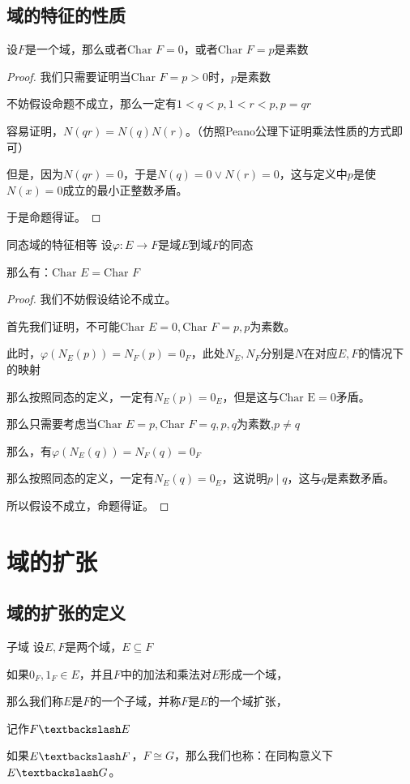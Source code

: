 \documentclass[12pt, a4paper, oneside, UTF8]{ctexbook}
\begin{document}
		\subsection{域的特征的性质}
			\begin{proposition}
				设$F$是一个域，那么或者$\text{Char }F=0$，或者$\text{Char }F =p$是素数
			\end{proposition}
			\begin{proof}
				我们只需要证明当$\text{Char }F =p>0$时，$p$是素数

				不妨假设命题不成立，那么一定有$1 < q < p,1 < r < p,p=qr$

				容易证明，$N(qr)=N(q)N(r)$。（仿照Peano公理下证明乘法性质的方式即可）

				但是，因为$N(qr)=0$，于是$N(q)=0 \vee N(r) = 0$，这与定义中$p$是使$N(x)=0$成立的最小正整数矛盾。

				于是命题得证。
			\end{proof}
			\begin{them}{同态域的特征相等}{}
				设$\varphi : E \to F$是域$E$到域$F$的同态

				那么有：$\text{Char }E = \text{Char }F$
			\end{them}
			\begin{proof}
				我们不妨假设结论不成立。

				首先我们证明，不可能$\text{Char }E =0, \text{Char }F = p,p$为素数。

				此时，$\varphi \left(N_E(p)\right)=N_F(p)=0_F$，此处$N_E,N_F$分别是$N$在对应$E,F$的情况下的映射

				那么按照同态的定义，一定有$N_E(p)=0_E$，但是这与$\text{Char E}=0$矛盾。

				那么只需要考虑当$\text{Char }E =p, \text{Char }F=q,p,q$为素数,$p \neq q$

				那么，有$\varphi \left(N_E(q)\right)=N_F(q)=0_F$

				那么按照同态的定义，一定有$N_E(q)=0_E$，这说明$p \mid q$，这与$q$是素数矛盾。

				所以假设不成立，命题得证。
			\end{proof}
	\section{域的扩张}
		\subsection{域的扩张的定义}
			\begin{defn}{子域}{}
				设$E,F$是两个域，$E \subseteq F$
				
				如果$0_F,1_F \in E$，并且$F$中的加法和乘法对$E$形成一个域，
				
				那么我们称$E$是$F$的一个子域，并称$F$是$E$的一个域扩张，
				
				记作$F\textbackslash E$
			\end{defn}
			如果$E \textbackslash F$，$F \cong G$，那么我们也称：在同构意义下$E \textbackslash G$。
\end{document}
